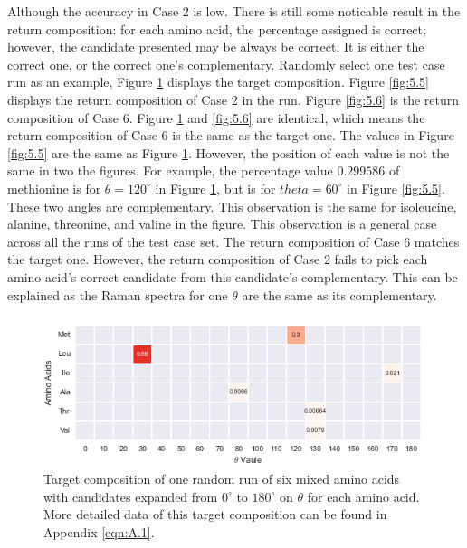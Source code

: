 Although the accuracy in Case 2 is low. There is still some noticable result in the return composition: for each amino acid, the percentage assigned is correct; however, the candidate presented may be always be correct. It is either the correct one, or the correct one's complementary. Randomly select one test case run as an example, Figure \ref{fig:5.4} displays the target composition. Figure \ref{fig:5.5} displays the return composition of Case 2 in the run. Figure \ref{fig:5.6} is the return composition of Case 6. Figure \ref{fig:5.4} and \ref{fig:5.6} are identical, which means the return composition of Case 6 is the same as the target one. The values in Figure \ref{fig:5.5} are the same as Figure \ref{fig:5.4}. However, the position of each value is not the same in two the figures. For example, the percentage value $0.299586$ of methionine is for $\theta = 120^{\circ}$ in Figure \ref{fig:5.4}, but is for $theta = 60^{\circ}$ in Figure \ref{fig:5.5}. These two angles are complementary. This observation is the same for isoleucine, alanine, threonine, and valine in the figure. This observation is a general case across all the runs of the test case set. The return composition of Case 6 matches the target one. However, the return composition of Case 2 fails to pick each amino acid's correct candidate from this candidate's complementary. This can be explained as the Raman spectra for one $\theta$ are the same as its complementary. \\

\begin{figure}[!ht] 
\centering
\includegraphics[scale=0.9]{Figures/mixture_target_composition_for_one_run_theta_0_180.png}
\caption{Target composition of one random run of six mixed amino acids with candidates expanded from $0^{\circ}$ to $180^{\circ}$ on $\theta$ for each amino acid. More detailed data of this target composition can be found in Appendix \ref{eqn:A.1}. } 
\label{fig:5.4}
\end{figure}

